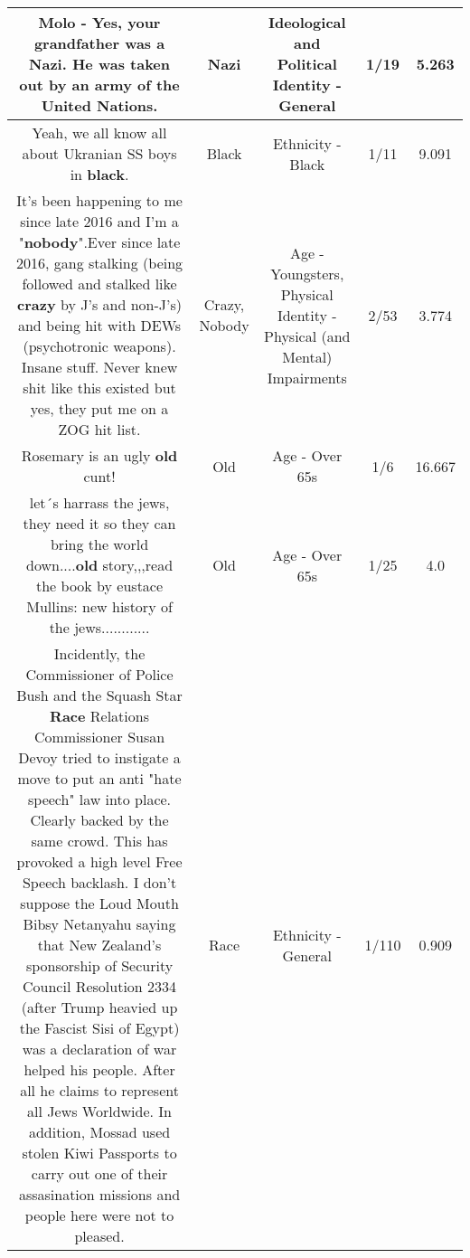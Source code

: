 \documentclass[11pt]{article}
\newlength\mylength
\begin{document}
\begin{center}
\begin{longtable}{|C{.65\mylength}|C{.30\mylength}|C{.12\mylength}|C{.12\mylength}|C{.12\mylength}|}
  \small Molo - Yes, your grandfather was a \textbf{Nazi}.  He was taken out by an army of the United Nations.\normalsize   & Nazi &  Ideological and Political Identity - General & 1/19 & 5.263 \\  \hline
  \small Yeah, we all know all about Ukranian SS boys in \textbf{black}.\normalsize   & Black & Ethnicity - Black & 1/11 & 9.091 \\  \hline
  \small It's been happening to me since late 2016 and I'm a "\textbf{nobody}".Ever since late 2016, gang stalking (being followed and stalked like \textbf{crazy} by J's and non-J's) and being hit with DEWs (psychotronic weapons). Insane stuff. Never knew shit like this existed but yes, they put me on a ZOG hit list.\normalsize   & Crazy, Nobody & Age - Youngsters, Physical Identity - Physical (and Mental) Impairments & 2/53 & 3.774 \\  \hline
  \small Rosemary is an ugly \textbf{old} cunt!\normalsize   & Old & Age - Over 65s & 1/6 & 16.667 \\  \hline
  \small let´s harrass the jews, they need it so they can bring the world down....\textbf{old} story,,,read the book by eustace Mullins: new history of the jews............\normalsize   & Old & Age - Over 65s & 1/25 & 4.0 \\  \hline
  \small Incidently, the Commissioner of Police Bush and the Squash Star \textbf{Race} Relations Commissioner Susan Devoy tried to instigate a move to put an anti "hate speech" law into place.  Clearly backed by the same crowd.  This has provoked a high level Free Speech backlash.  I don't suppose the Loud Mouth Bibsy Netanyahu saying that New Zealand's sponsorship of Security Council Resolution 2334  (after Trump heavied up the Fascist Sisi of Egypt) was a declaration of war helped his people.  After all he claims to represent all Jews Worldwide.  In addition, Mossad used stolen Kiwi Passports to carry out one of their assasination missions and people here were not to pleased.\normalsize   & Race & Ethnicity - General & 1/110 & 0.909 \\  \hline

\end{longtable}
\end{center}
\end{document}
